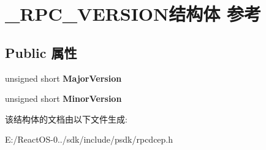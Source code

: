 \hypertarget{struct___r_p_c___v_e_r_s_i_o_n}{}\section{\+\_\+\+R\+P\+C\+\_\+\+V\+E\+R\+S\+I\+O\+N结构体 参考}
\label{struct___r_p_c___v_e_r_s_i_o_n}
\subsection*{Public 属性}
\begin{DoxyCompactItemize}
\item 
\mbox{\label{struct___r_p_c___v_e_r_s_i_o_n_a2f6f16ba73e7d64f5b968bff28b3f73b}} 
unsigned short {\bfseries Major\+Version}
\item 
\mbox{\label{struct___r_p_c___v_e_r_s_i_o_n_a8e173dde61192dfee64d574c5211d002}} 
unsigned short {\bfseries Minor\+Version}
\end{DoxyCompactItemize}


该结构体的文档由以下文件生成\+:\begin{DoxyCompactItemize}
\item 
E\+:/\+React\+O\+S-\/0../sdk/include/psdk/rpcdcep.\+h\end{DoxyCompactItemize}
